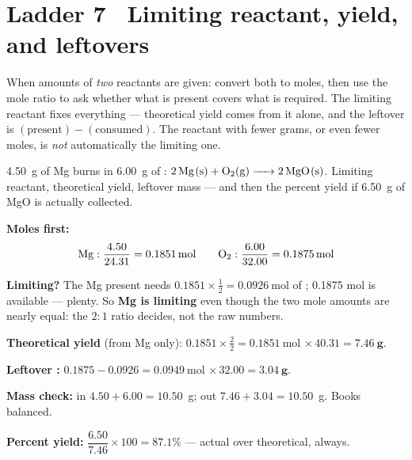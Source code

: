 \documentclass{apchem-worksheet}
\begin{document}
\section*{\sffamily Ladder 7 \textbullet\ Limiting reactant, yield, and
leftovers}

When amounts of \emph{two} reactants are given: convert both to moles,
then use the mole ratio to ask whether what is present covers what is
required. The limiting reactant fixes everything --- theoretical yield
comes from it alone, and the leftover is
$(\text{present}) - (\text{consumed})$. The reactant with fewer grams, or
even fewer moles, is \emph{not} automatically the limiting one.

\begin{workedexample}
\SI{4.50}{\gram} of Mg burns in \SI{6.00}{\gram} of :
$\ce{2Mg(s) + O2(g) -> 2MgO(s)}$. Limiting reactant, theoretical yield,
leftover mass --- and then the percent yield if \SI{6.50}{\gram} of MgO is
actually collected.

\textbf{Moles first:}
\[ \ce{Mg}: \frac{4.50}{24.31} = \SI{0.1851}{\mole} \qquad
   \ce{O2}: \frac{6.00}{32.00} = \SI{0.1875}{\mole} \]

\textbf{Limiting?} The Mg present needs
$0.1851 \times \tfrac{1}{2} = \SI{0.0926}{\mole}$ of ; 0.1875 mol
is available --- plenty. So \textbf{Mg is limiting} even though the two
mole amounts are nearly equal: the $2{:}1$ ratio decides, not the raw
numbers.

\textbf{Theoretical yield} (from Mg only):
$0.1851 \times \tfrac{2}{2} = \SI{0.1851}{\mole}$ 
$\times\, 40.31 = \mathbf{7.46~g}$.

\textbf{Leftover :} $0.1875 - 0.0926 = \SI{0.0949}{\mole}$
$\times\, 32.00 = \mathbf{3.04~g}$.

\textbf{Mass check:} in $4.50 + 6.00 = 10.50$~g; out
$7.46 + 3.04 = 10.50$~g. Books balanced.

\textbf{Percent yield:}
$\dfrac{6.50}{7.46} \times 100 = \mathbf{87.1\%}$ --- actual over
theoretical, always.
\end{workedexample}
\end{document}
